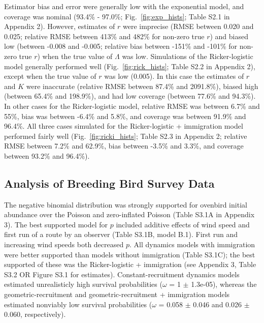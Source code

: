 \documentclass[12pt]{article}
\begin{document}
Estimator bias and error were generally low with the exponential model, and 
coverage was nominal (93.4\% - 97.0\%; Fig.~\ref{fig:exp_hists}; Table S2.1 in Appendix 2). 
However, estimates of $r$ were 
imprecise (RMSE between 0.020 and 0.025; relative RMSE between 413\% and 
482\% for non-zero true $r$) and biased low (between -0.008 and -0.005; relative bias between
-151\% and -101\% for non-zero true $r$) when the true value of
$\Lambda$ was low. %
Simulations of the Ricker-logistic model %
generally performed well (Fig.~\ref{fig:rick_hists}; 
Table S2.2 in Appendix 2), except when the true value of $r$ was low (0.005). In this case the 
estimates of $r$ and $K$ were inaccurate (relative RMSE between 87.4\% and 2091.8\%),
biased high (between 65.4\% and 198.9\%), and had low coverage (between 77.6\% and 94.3\%).
In other cases for the Ricker-logistic model, relative RMSE was between 6.7\%
and 55\%, bias was between -6.4\% and 5.8\%, and coverage was between
91.9\% and 96.4\%.  All three cases simulated for the Ricker-logistic + immigration model 
performed fairly well (Fig.~\ref{fig:ricki_hists}; Table S2.3 in Appendix 2; relative RMSE between 7.2\% 
and 62.9\%, bias between -3.5\% and 3.3\%, and coverage between
93.2\% and 96.4\%).
  
\subsection{Analysis of Breeding Bird Survey Data}


The negative binomial distribution was strongly supported for ovenbird
initial abundance over the Poisson and zero-inflated Poisson
(Table S3.1A in Appendix 3). %
The best supported model for $p$ included additive effects of wind speed
and first run of a route by an observer (Table S3.1B, model B.1). First run 
and increasing wind speeds both decreased $p$. All dynamics models 
with immigration were better supported than models without immigration 
(Table S3.1C); the best supported of these was the Ricker-logistic + immigration 
(see Appendix 3, Table S3.2 OR Figure S3.1 for estimates).
Constant-recruitment dynamics models estimated unrealisticly high
survival probabilities ($\omega$ = 1 $\pm$ 1.3e-05), whereas %
the geometric-recruitment and geometric-recruitment + immigration
models estimated nonviably low survival probabilities %
($\omega$ =
0.058 $\pm$ 0.046 and 0.026 $\pm$ 0.060, respectively). 
\end{document}
